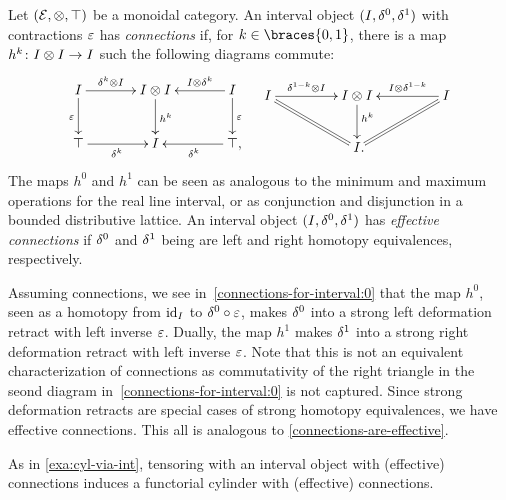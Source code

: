 \documentclass[reqno,10pt,a4paper,oneside]{amsart}
\begin{document}
\begin{example} \label{exa:connections-for-interval}
Let $(\mathcal{E}, \otimes, \top)$ be a monoidal category.
An interval object $(I, \delta^0, \delta^1)$ with contractions $\varepsilon$ has \emph{connections} if, for $k \in \braces{0, 1}$, there is a map $h^k \colon I \otimes I \to I$ such the following diagrams commute:
\begin{align} \label{connections-for-interval:0}
\begin{aligned}
\xymatrix@C+1em{
  \interval
  \ar[r]^-{\kcyl \otimes \interval}
  \ar[d]_{\ccyl}
&
  \interval \otimes \interval
  \ar[d]^{h^k}
&
  \interval
  \ar[l]_-{\interval \otimes \kcyl}
  \ar[d]^{\ccyl}
\\
  \top
  \ar[r]_{\kcyl}
&
  \interval
&
  \top
  \ar[l]^{\kcyl}
\rlap{,}}
\end{aligned}
&&
\begin{aligned}
\xymatrix@C+2em{
  \interval
  \ar[r]^-{\kcylinv \otimes \interval}
  \ar@{=}[dr]
&
  \interval \otimes \interval
  \ar[d]^(0.4){h^k}
&
  \interval
  \ar[l]_-{\interval \otimes \kcylinv}
  \ar@{=}[dl]
\\&
  \interval
\rlap{.}}
\end{aligned}
\end{align}
The maps $h^0$ and $h^1$ can be seen as analogous to the minimum and maximum operations for the real line interval, or as conjunction and disjunction in a bounded distributive lattice.
An interval object $(I, \delta^0, \delta^1)$ has \emph{effective connections} if $\delta^0$ and $\delta^1$ being are left and right homotopy equivalences, respectively.

Assuming connections, we see in~\eqref{connections-for-interval:0} that the map $h^0$, seen as a homotopy from $\operatorname{id}_I$ to $\delta^0 \mathbin{\circ} \varepsilon$, makes $\delta^0$ into a strong left deformation retract with left inverse $\varepsilon$.
Dually, the map $h^1$ makes $\delta^1$ into a strong right deformation retract with left inverse $\varepsilon$.
Note that this is not an equivalent characterization of connections as commutativity of the right triangle in the seond diagram in~\eqref{connections-for-interval:0} is not captured.
Since strong deformation retracts are special cases of strong homotopy equivalences, we have effective connections.
This all is analogous to \cref{connections-are-effective}.

As in \cref{exa:cyl-via-int}, tensoring with an interval object with (effective) connections induces a functorial cylinder with (effective) connections.
\end{example}
\end{document}
